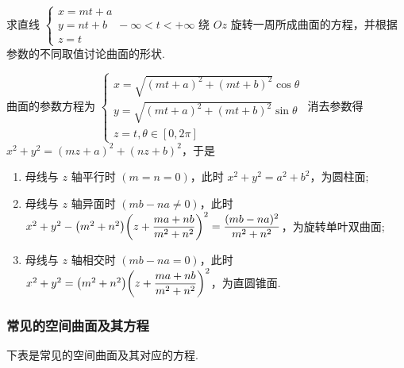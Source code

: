 \begin{example}
    求直线 $\begin{cases}
        x=mt+a\\
        y=nt+b\\
        z=t
    \end{cases}-\infty<t<+\infty$ 绕 $Oz$ 旋转一周所成曲面的方程，并根据参数的不同取值讨论曲面的形状.
\end{example}
\begin{solution}
    曲面的参数方程为 $\begin{cases}
        x=\sqrt{(mt+a)^2+(mt+b)^2}\cos\theta\\
        y=\sqrt{(mt+a)^2+(mt+b)^2}\sin\theta\\
        z=t,\theta\in[0,2\pi]
    \end{cases}$
    消去参数得 $x^2+y^2=(mz+a)^2+(nz+b)^2$，于是 
    \begin{enumerate}[label=(\arabic{*})]
        \item 母线与 $z$ 轴平行时 $(m=n=0)$，此时 $x^2+y^2=a^2+b^2$，为圆柱面;
        \item 母线与 $z$ 轴异面时 $(mb-na\neq0)$，此时 $x^2+y^2-\qty(m^2+n^2)\qty(z+\dfrac{ma+nb}{m^2+n^2})^2=\dfrac{(mb-na)^2}{m^2+n^2}$，为旋转单叶双曲面;
        \item 母线与 $z$ 轴相交时 $(mb-na=0)$，此时 $x^2+y^2=\qty(m^2+n^2)\qty(z+\dfrac{ma+nb}{m^2+n^2})^2$，为直圆锥面.
    \end{enumerate}
\end{solution}

\subsubsection{常见的空间曲面及其方程}

下表是常见的空间曲面及其对应的方程.


